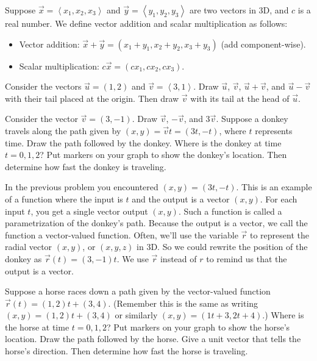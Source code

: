 \begin{definition}
Suppose $\vec x=\left<x_1,x_2,x_3\right>$ and $\vec y=\left<y_1,y_2,y_3\right>$ are two vectors in 3D, and $c$ is a real number. We define vector addition and scalar multiplication as follows:
\begin{itemize}
\item Vector addition: $\vec x+\vec y = (x_1+y_1,x_2+y_2,x_3+y_3)$ (add component-wise).
\item Scalar multiplication: $c\vec x = (cx_1,cx_2,cx_3)$.
\end{itemize}
\end{definition}


\begin{problem}
Consider the vectors $\vec u=(1,2)$ and $\vec v=\left<3,1\right>$.  Draw $\vec u$, $\vec v$, $\vec u+\vec v$, and $\vec u-\vec v$ with their tail placed at the origin.  Then draw $\vec v$ with its tail at the head of $\vec u$. 
\end{problem}

\begin{problem}
Consider the vector $\vec v=(3,-1)$.  Draw $\vec v$, $-\vec v$, and $3\vec v$. 
Suppose a donkey travels along the path given by $(x,y)=\vec v t = (3t,-t)$, where $t$ represents time. Draw the path followed by the donkey. Where is the donkey at time $t=0,1,2$? Put markers on your graph to show the donkey's location. Then determine how fast the donkey is traveling.
\end{problem}

In the previous problem you encountered $(x,y)=(3t,-t)$.  This is an example of a function where the input is $t$ and the output is a vector $(x,y)$.  For each input $t$, you get a single vector output $(x,y)$. Such a function is called a parametrization of the donkey's path. Because the output is a vector, we call the function a vector-valued function. Often, we'll use the variable $\vec r$ to represent the radial vector $(x,y)$, or $(x,y,z)$ in 3D.  So we could rewrite the position of the donkey as $\vec r(t)=(3,-1)t$. We use $\vec r$ instead of $r$ to remind us that the output is a vector.

\begin{problem}\label{horse line}
Suppose a horse races down a path given by the vector-valued function $\vec r(t) = (1,2)t+(3,4)$. (Remember this is the same as writing $(x,y) =  (1,2)t+(3,4)$ or similarly  $(x,y)=(1t+3,2t+4)$.)
Where is the horse at time $t=0,1,2$? Put markers on your graph to show the horse's location. Draw the path followed by the horse. Give a unit vector that tells the horse's direction. Then determine how fast the horse is traveling.
\end{problem}


